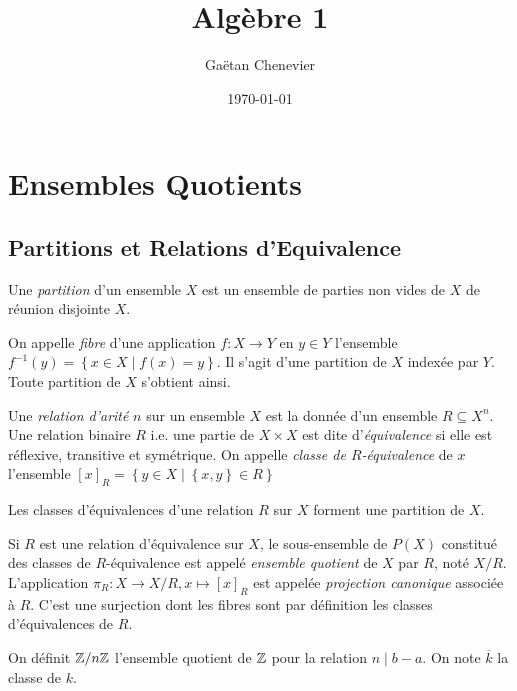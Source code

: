 \documentclass{cours}
\title{Algèbre 1}
\author{Gaëtan Chenevier}
\date{\today}
\begin{document}
\newpage
\section{Ensembles Quotients}
\subsection{Partitions et Relations d'Equivalence}
\begin{definition}
    Une \emph{partition} d'un ensemble $X$ est un ensemble de parties non vides de $X$ de réunion disjointe $X$.
\end{definition}
\begin{definition}
    On appelle \emph{fibre} d'une application $f : X \rightarrow Y$ en $y \in Y$ l'ensemble $f^{-1}(y) = \left\{x \in X \mid f(x) = y\right\}$. Il s'agit d'une partition de $X$ indexée par $Y$. Toute partition de $X$ s'obtient ainsi.
\end{definition}

\begin{definition}
    Une \emph{relation d'arité} $n$ sur un ensemble $X$ est la donnée d'un ensemble $R \subseteq X^{n}$. Une relation binaire $R$ i.e. une partie de $X\times X$ est dite d'\emph{équivalence} si elle est réflexive, transitive et symétrique. On appelle \emph{classe de $R$-équivalence} de $x$ l'ensemble $\left[x\right]_{R} = \left\{y \in X \mid \left\{x, y\right\} \in R\right\}$
\end{definition}

\begin{proposition}\label{partclassdeq}
    Les classes d'équivalences d'une relation $R$ sur $X$ forment une partition de $X$.
\end{proposition}

\begin{definition}
    Si $R$ est une relation d'équivalence sur $X$, le sous-ensemble de $P(X)$ constitué des classes de $R$-équivalence est appelé \emph{ensemble quotient} de $X$ par $R$, noté $X/R$. L'application $\pi_{R} : X \rightarrow X/R, x \mapsto \left[x\right]_{R}$ est appelée \emph{projection canonique} associée à $R$. C'est une surjection dont les fibres sont par définition les classes d'équivalences de $R$.
\end{definition}

\begin{example}
    On définit $\mathbb{Z}/n\mathbb{Z}$ l'ensemble quotient de $\mathbb{Z}$ pour la relation $n \mid b - a$. On note $\overline{k}$ la classe de $k$.
\end{example}
\end{document}
